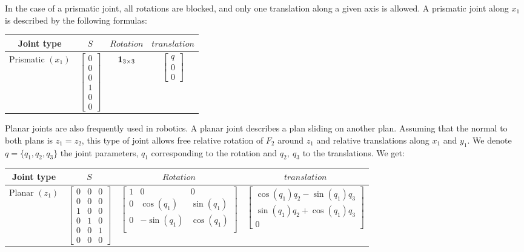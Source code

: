 In the case of a prismatic joint, all rotations are blocked, and only one translation along a given axis is allowed.
A prismatic joint along $x_1$ is described by the following formulas:
\begin{table}[H]
\centering
\begin{tabular}{cccc}
  \toprule
  Joint type & $S$ & $Rotation$ & $translation$ \\
  \midrule
  Prismatic $(x_1)$
  &
  $\begin{bmatrix}
    0 \\ 0 \\ 0 \\ 1 \\ 0 \\ 0
  \end{bmatrix}$
  &
  ${\bf 1}_{3\times3} $
  &
  $\begin{bmatrix}
    q \\ 0 \\ 0
  \end{bmatrix}$
  \\
  \bottomrule
\end{tabular}
\end{table}

Planar joints are also frequently used in robotics.
A planar joint describes a plan sliding on another plan. Assuming that the normal to both plans is $z_1 = z_2$, this type of joint allows free relative rotation of $F_2$ around $z_1$ and relative translations along $x_1$ and $y_1$.
We denote $q = \{q_1, q_2, q_3\}$ the joint parameters, $q_1$ corresponding to the rotation and $q_2,\ q_3$ to the translations.
We get:
\begin{table}[H]
\centering
\begin{tabular}{cccc}
  \toprule
  Joint type & $S$ & $Rotation$ & $translation$ \\
  \midrule
  Planar $(z_1)$
  &
  $\begin{bmatrix}
    0 & 0 & 0 \\ 0 & 0 & 0 \\ 1 & 0 & 0 \\ 0 & 1 & 0 \\ 0 & 0 & 1 \\ 0 & 0 & 0
  \end{bmatrix}$
  &
  $\begin{bmatrix}
    1 & 0 & 0 \\
    0 & \cos(q_1) & \sin(q_1) \\
    0 & -\sin(q_1) & \cos(q_1) \\
  \end{bmatrix}$
  &
  $\begin{bmatrix}
    \cos(q_1)q_2 - \sin(q_1)q_3 \\ \sin(q_1)q_2 + \cos(q_1)q_3 \\ 0
  \end{bmatrix}$
  \\
  \bottomrule
\end{tabular}
\end{table}

